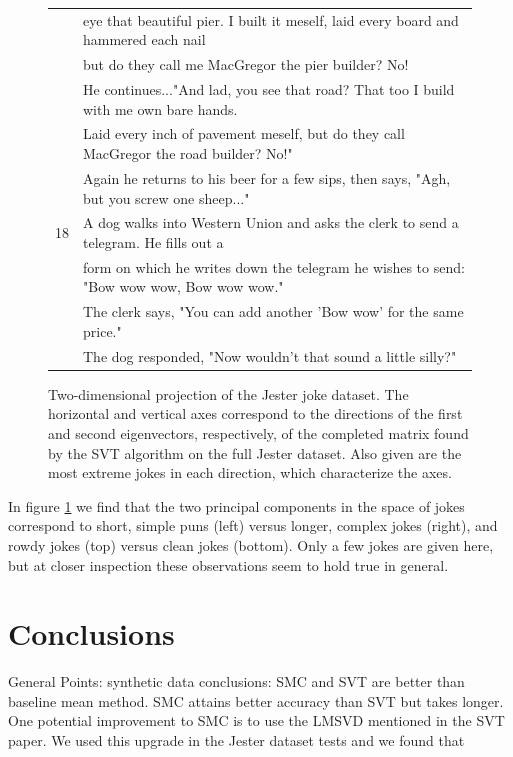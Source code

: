 \documentclass{article} %
\begin{document}
\begin{figure} [h]
\begin{tabular}{c | l}
     & eye that beautiful pier. I built it meself, laid every board
       and hammered each nail \\
     & but do they call me MacGregor the pier builder? No! \\
     & He continues..."And lad, you see that road? That too I build with me
       own bare hands. \\
     & Laid every inch of pavement meself, but do they
       call MacGregor the road builder? No!" \\
     & Again he returns to his beer for a few sips, then says,
       "Agh, but you screw  one sheep..." \\ \hline
  18 & A dog walks into Western Union and asks the clerk to send a
       telegram. He fills out a \\
     & form on which he writes down the telegram he wishes to send:
       "Bow wow wow, Bow wow wow." \\
     & The clerk says, "You can add another 'Bow wow' for the same
       price."\\
     & The dog responded, "Now wouldn't that sound a little silly?"\\ 
\hline \hline
\end{tabular}

\caption{Two-dimensional projection of the Jester joke dataset. The
  horizontal and vertical axes correspond to the directions of the
  first and second eigenvectors, respectively, of the completed matrix
  found by the SVT algorithm on the full Jester dataset. Also given
  are the most extreme jokes in each direction, which characterize the
  axes.}
\label{jokes2d}
\end{figure}

In figure \ref{jokes2d} we find that the two principal components in
the space of jokes correspond to short, simple puns (left) versus
longer, complex jokes (right), and rowdy jokes (top) versus clean
jokes (bottom). Only a few jokes are given here, but at closer
inspection these observations seem to hold true in general.


\section{Conclusions}

General Points: synthetic data conclusions: SMC and SVT are better
than baseline mean method. SMC attains better accuracy than SVT but
takes longer. One potential improvement to SMC is to use the LMSVD
mentioned in the SVT paper. We used this upgrade in the Jester dataset
tests and we found that
\end{document}
